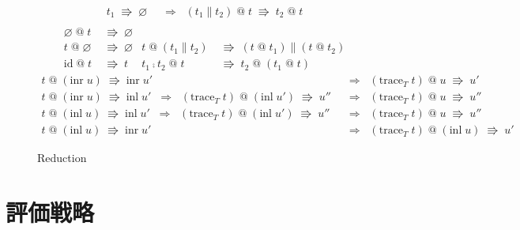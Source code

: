 \documentclass{jsarticle}
\newcommand{\reduct}[2]{#1 &\;\Rrightarrow\; #2}
\newcommand{\reduction}[2]{#1 \;\Rrightarrow\; #2}
\begin{document}
\begin{figure}[H]
\begin{align*}
    \reduction{t_1}{\varnothing} &\;\;\Longrightarrow\;\; \reduction{(t_1\parallel{}t_2)\;\text{@}\;t}{t_2\;\text{@}\;t} \\
  \end{align*}
  \begin{align*}
    \reduct{\varnothing\;\text{@}\;t}{\varnothing} \\
    \reduct{t\;\text{@}\;\varnothing}{\varnothing} &
    \reduct{t\;\text{@}\;(t_1\parallel{}t_2)}{(t\;\text{@}\;t_1)\parallel(t\;\text{@}\;t_2)} \\
    \reduct{\text{id}\;\text{@}\;t}{t} &
    \reduct{t_1\fcmp{}t_2\;\text{@}\;t}{t_2\;\text{@}\;(t_1\;\text{@}\;t)}
  \end{align*}
  \begin{align*}
    \reduction{t\;\text{@}\;(\text{inr}\;u)}{\text{inr}\;u'} &\;\;\Longrightarrow\;\; \reduction{(\text{trace}_T\;t)\;\text{@}\;u}{u'} \\
    \reduction{t\;\text{@}\;(\text{inr}\;u)}{\text{inl}\;u'} \;\;\Longrightarrow\;\; \reduction{(\text{trace}_T\;t)\;\text{@}\;(\text{inl}\;u')}{u''} &\;\;\Longrightarrow\;\; \reduction{(\text{trace}_T\;t)\;\text{@}\;u}{u''} \\
    \reduction{t\;\text{@}\;(\text{inl}\;u)}{\text{inl}\;u'} \;\;\Longrightarrow\;\; \reduction{(\text{trace}_T\;t)\;\text{@}\;(\text{inl}\;u')}{u''} &\;\;\Longrightarrow\;\; \reduction{(\text{trace}_T\;t)\;\text{@}\;u}{u''} \\
    \reduction{t\;\text{@}\;(\text{inl}\;u)}{\text{inr}\;u'} &\;\;\Longrightarrow\;\; \reduction{(\text{trace}_T\;t)\;\text{@}\;(\text{inl}\;u)}{u'}
  \end{align*}
  \caption{Reduction}
  \label{fig:reduction}
\end{figure}

\section{評価戦略}

\end{document}
